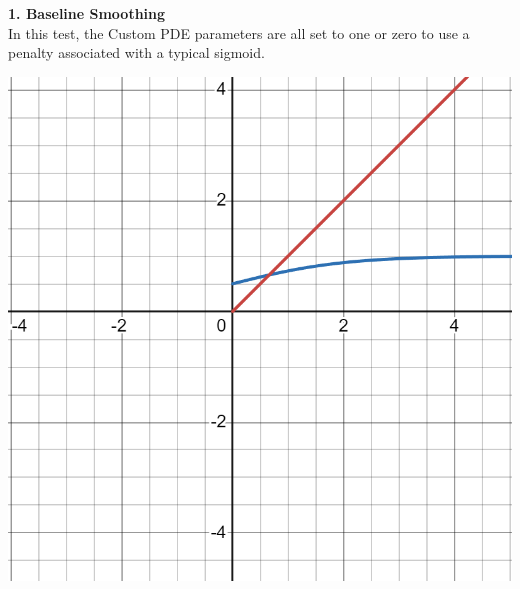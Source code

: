 \documentclass{article}
\begin{document}
  \noindent
  \textbf{1. Baseline Smoothing}\\
  In this test, the Custom PDE parameters are all set to one or zero to use 
  a penalty associated with a typical sigmoid.\\
  \begin{center}
    \includegraphics[scale=0.1]{../report_images/baseline_smoothing.png}\\
  \end{center}
\end{document}

